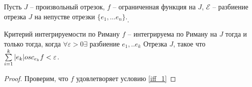 \documentclass[12pt]{report}
\begin{document}
\begin{note}
    Пусть $ J$ -- произвольный отрезок, $ f$ -- ограниченная функция на $ J$, $ \mathcal{E}$ -- разбиение отрезка $ J  $ на непустве отрезки $ \{e_1, \ldots  e_n\}$.
    \[
    .\] 
\end{note}
\begin{thm}{Критерий интегрируемости по Риману}
    $ f$ -- интегрируема по Риману на $ J$ тогда и только тогда, когда $ \forall  \varepsilon >0 \exists $ разбиение $ e_1, .. e_k$ Отрезка $ J$, такое что $ \sum\limits_{i=1}^{k}|e_k| osc_{e_k} f < \varepsilon $. \label{iff_1}
\end{thm}
\begin{proof}
    Проверим, что $ f$ удовлетворяет условию  \ref{iff_1}
\end{proof}
\end{document}
